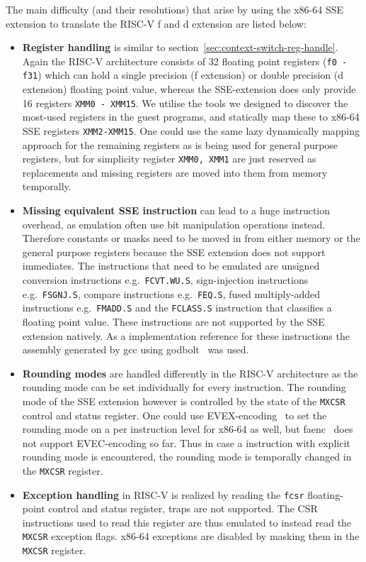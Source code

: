 The main difficulty (and their resolutions) that arise by using the x86-64 SSE extension to translate the RISC-V f and d extension are listed below:
\begin{itemize}
    \item \textbf{Register handling} is similar to section~\ref{sec:context-switch-reg-handle}.
            Again the RISC-V architecture consists of 32 floating point registers (\texttt{f0 - f31}) which can hold a single precision (f extension) or double precision (d extension) floating point value, whereas the SSE-extension does only provide 16 registers \texttt{XMM0 - XMM15}.
            We utilise the tools we designed to discover the most-used registers in the guest programs, and statically map these to x86-64 SSE registers \texttt{XMM2-XMM15}.
            One could use the same lazy dynamically mapping approach for the remaining registers as is being used for general purpose registers, but for simplicity register \texttt{XMM0, XMM1} are just reserved as replacements and missing registers are moved into them from memory temporally.
    \item \textbf{Missing equivalent SSE instruction} can lead to a huge instruction overhead, as emulation often use bit manipulation operations instead.
            Therefore constants or masks need to be moved in from either memory or the general purpose registers because the SSE extension does not support immediates.
            The instructions that need to be emulated are unsigned conversion instructions e.g.~\texttt{FCVT.WU.S}, sign-injection instructions e.g.~\texttt{FSGNJ.S}, compare instructions e.g.~\texttt{FEQ.S}, fused multiply-added instructions e.g.~\texttt{FMADD.S} and the \texttt{FCLASS.S} instruction that classifies a floating point value.
            These instructions are not supported by the SSE extension natively.
            As a implementation reference for these instructions the assembly generated by gcc using godbolt~\cite{godbolt} was used.
    \item \textbf{Rounding modes} are handled differently in the RISC-V architecture as the rounding mode can be set individually for every instruction.
            The rounding mode of the SSE extension however is controlled by the state of the \texttt{MXCSR} control and status register.
            One could use EVEX-encoding~\cite[S.374]{intel2017man} to set the rounding mode on a per instruction level for x86-64 as well, but faenc~\cite{faenc} does not support EVEC-encoding so far.  %
            Thus in case a instruction with explicit rounding mode is encountered, the rounding mode is temporally changed in the \texttt{MXCSR} register.
    \item \textbf{Exception handling} in RISC-V is realized by reading the \texttt{fcsr} floating-point control and status register, traps are not supported.
            The CSR instructions used to read this register are thus emulated to instead read the \texttt{MXCSR} exception flags.
            x86-64 exceptions are disabled by masking them in the \texttt{MXCSR} register.
\end{itemize}


